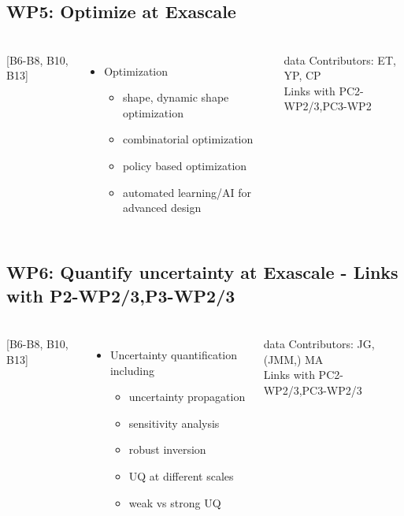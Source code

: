 \subsection{WP5: Optimize at Exascale }
\begin{frame}
  \frametitle{\insertsectionhead}
  \framesubtitle{\insertsubsectionhead}
  \begin{columns}
    [B6-B8, B10, B13]
    \begin{itemize}
      \item Optimization 
      \begin{itemize}
        \item shape, dynamic shape optimization
        \item combinatorial optimization
        \item policy based optimization
        \item automated learning/AI for advanced design
      \end{itemize}
    \end{itemize}
    \begin{alertblock}{data}
      Contributors: ET, YP, CP\\
      Links with PC2-WP2/3,PC3-WP2 
    \end{alertblock}
  \end{columns}
\end{frame}

\subsection{WP6: Quantify uncertainty at Exascale - Links with P2-WP2/3,P3-WP2/3 }
\begin{frame}
  \frametitle{\insertsectionhead}
  \framesubtitle{\insertsubsectionhead}
  \begin{columns}
    [B6-B8, B10, B13]
    \begin{itemize}
      \item Uncertainty quantification including 
      \begin{itemize}
        \item uncertainty propagation
        \item sensitivity analysis
        \item robust inversion
        \item UQ at different scales
        \item weak vs strong UQ
      \end{itemize}
    \end{itemize}
    \begin{alertblock}{data}
      Contributors: JG, (JMM,) MA\\
      Links with PC2-WP2/3,PC3-WP2/3
    \end{alertblock}
  \end{columns}
\end{frame}


